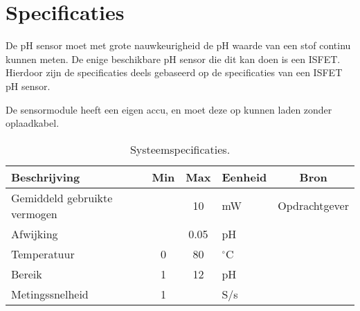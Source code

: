 \section{Specificaties}
De pH sensor moet met grote nauwkeurigheid de pH waarde van een stof continu kunnen meten. 
De enige beschikbare pH sensor die dit kan doen is een ISFET.
Hierdoor zijn de specificaties deels gebaseerd op de specificaties van een ISFET pH sensor.

De sensormodule heeft een eigen accu, en moet deze op kunnen laden zonder oplaadkabel.

\begin{table}[ht]
    \centering
    \begin{tabular}{|l|c c|l|c|}
        \hline
        Beschrijving                 & Min & Max  & Eenheid   & Bron \\
        \hline 
        Gemiddeld gebruikte vermogen &     & 10   & mW        & Opdrachtgever \\
        Afwijking                    &     & 0.05 & pH        & \cite{isfet}  \\ 
        Temperatuur                  & 0   & 80   & $^\circ$C & \cite{isfet}  \\
        Bereik                       & 1   & 12   & pH        & \cite{isfet}  \\
        Metingssnelheid              & 1   &      & S/s       & \cite{isfet}  \\
        \hline
    \end{tabular}
    \caption{Systeemspecificaties.}
    \label{tab:systemSpecs}
\end{table}




